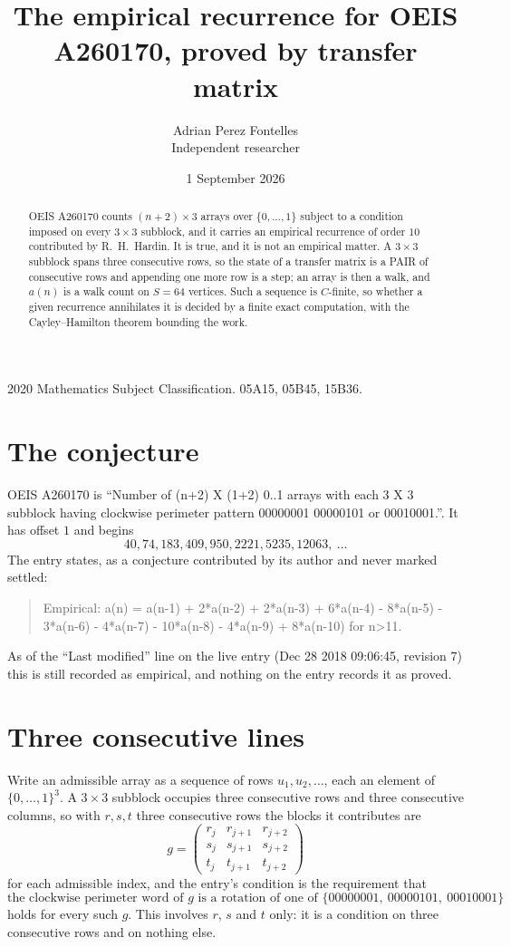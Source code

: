 \documentclass[11pt,a4paper]{article}
\title{The empirical recurrence for OEIS A260170, proved by transfer matrix}
\author{Adrian Perez Fontelles\\ \small Independent researcher}
\date{1 September 2026}
\theoremstyle{plain}
\theoremstyle{definition}
\begin{document}
\maketitle

\begin{abstract}
OEIS A260170 counts $(n+2)\times3$ arrays over $\{0,\dots,1\}$ subject to a condition imposed on
every $3\times3$ subblock, and it carries an empirical recurrence of order $10$
contributed by R.~H.~Hardin. It is true, and it is not an empirical matter. A $3\times3$
subblock spans three consecutive rows, so the state of a transfer matrix is a PAIR of
consecutive rows and appending one more row is a step; an array is then a walk, and
$a(n)$ is a walk count on $S=64$ vertices. Such a sequence is $C$-finite, so whether a given
recurrence annihilates it is decided by a finite exact computation, with the Cayley--Hamilton
theorem bounding the work.
\end{abstract}

\noindent\small 2020 Mathematics Subject Classification. 05A15, 05B45, 15B36.\normalsize

\section{The conjecture}

OEIS A260170 is ``Number of (n+2) X (1+2) 0..1 arrays with each 3 X 3 subblock having clockwise perimeter pattern 00000001 00000101 or 00010001.''. It has offset $1$ and begins
\[
40, 74, 183, 409, 950, 2221, 5235, 12063,\ \dots
\]
The entry states, as a conjecture contributed by its author and never marked settled:
\begin{quote}
Empirical: a(n) = a(n-1) + 2*a(n-2) + 2*a(n-3) + 6*a(n-4) - 8*a(n-5) - 3*a(n-6) - 4*a(n-7) - 10*a(n-8) - 4*a(n-9) + 8*a(n-10) for n>11.
\end{quote}
As of the ``Last modified'' line on the live entry (Dec 28 2018 09:06:45, revision 7) this is still
recorded as empirical, and nothing on the entry records it as proved.

\section{Three consecutive lines}

Write an admissible array as a sequence of rows $u_1,u_2,\dots$, each an element of
$\{0,\dots,1\}^{3}$. A $3\times3$ subblock occupies three consecutive rows and
three consecutive columns, so with $r,s,t$ three consecutive rows the blocks it
contributes are
\[
g=\begin{pmatrix}r_j&r_{j+1}&r_{j+2}\\ s_j&s_{j+1}&s_{j+2}\\ t_j&t_{j+1}&t_{j+2}\end{pmatrix}
\]
for each admissible index, and the entry's condition is the requirement that
\[
\text{the clockwise perimeter word of }g\text{ is a rotation of one of }\{00000001,\ 00000101,\ 00010001\}
\]
holds for every such $g$. This involves $r$, $s$ and $t$ only: it is a condition on
three consecutive rows and on nothing else.
\end{document}

